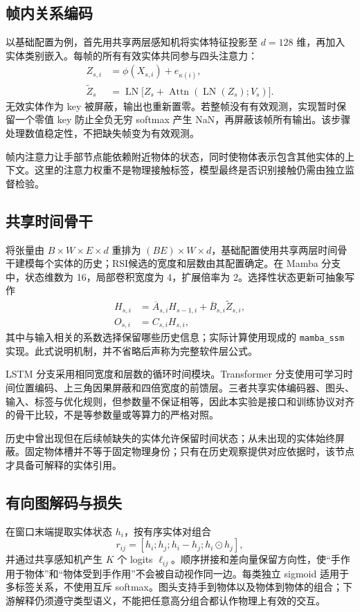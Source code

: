 \documentclass[10pt,twocolumn,letterpaper]{article}
\newcommand{\code}[1]{\texttt{\small #1}}
\begin{document}
\subsection{帧内关系编码}
以基础配置为例，首先用共享两层感知机将实体特征投影至 $d=128$ 维，再加入实体类别嵌入。每帧的所有有效实体共同参与四头注意力：
\begin{align}
 Z_{s,i}&=\phi(X_{s,i})+e_{\kappa(i)},\\
 \widetilde Z_s&=\operatorname{LN}\big[Z_s+
 \operatorname{Attn}(\operatorname{LN}(Z_s);V_s)\big].
\end{align}
无效实体作为 key 被屏蔽，输出也重新置零。若整帧没有有效观测，实现暂时保留一个零值 key 防止全负无穷 softmax 产生 NaN，再屏蔽该帧所有输出。该步骤处理数值稳定性，不把缺失帧变为有效观测。

帧内注意力让手部节点能依赖附近物体的状态，同时使物体表示包含其他实体的上下文。这里的注意力权重不是物理接触标签，模型最终是否识别接触仍需由独立监督检验。

\subsection{共享时间骨干}
将张量由 $B\times W\times E\times d$ 重排为 $(BE)\times W\times d$，基础配置使用共享两层时间骨干建模每个实体的历史；RSI候选的宽度和层数由其配置确定。在 Mamba 分支中，状态维数为 16，局部卷积宽度为 4，扩展倍率为 2。选择性状态更新可抽象写作
\begin{align}
 H_{s,i}&=\overline A_{s,i}H_{s-1,i}
             +\overline B_{s,i}\widetilde Z_{s,i},\\
 O_{s,i}&=C_{s,i}H_{s,i},
\end{align}
其中与输入相关的系数选择保留哪些历史信息；实际计算使用现成的 \code{mamba\_ssm} 实现。此式说明机制，并不省略后声称为完整软件层公式。

LSTM 分支采用相同宽度和层数的循环时间模块。Transformer 分支使用可学习时间位置编码、上三角因果屏蔽和四倍宽度的前馈层。三者共享实体编码器、图头、输入、标签与优化规则，但参数量不保证相等，因此本实验是接口和训练协议对齐的骨干比较，不是等参数量或等算力的严格对照。

历史中曾出现但在后续帧缺失的实体允许保留时间状态；从未出现的实体始终屏蔽。固定物体槽并不等于固定物理身份；只有在历史观察提供对应依据时，该节点才具备可解释的实体引用。

\subsection{有向图解码与损失}
在窗口末端提取实体状态 $h_i$，按有序实体对组合
\begin{equation}
 r_{ij}=[h_i;h_j;h_i-h_j;h_i\odot h_j],
\end{equation}
并通过共享感知机产生 $K$ 个 logits $\ell_{ij}$。顺序拼接和差向量保留方向性，使“手作用于物体”和“物体受到手作用”不会被自动视作同一边。每类独立 sigmoid 适用于多标签关系，不使用互斥 softmax。图头支持手到物体以及物体到物体的组合；下游解释仍须遵守类型语义，不能把任意高分组合都认作物理上有效的交互。
\end{document}
